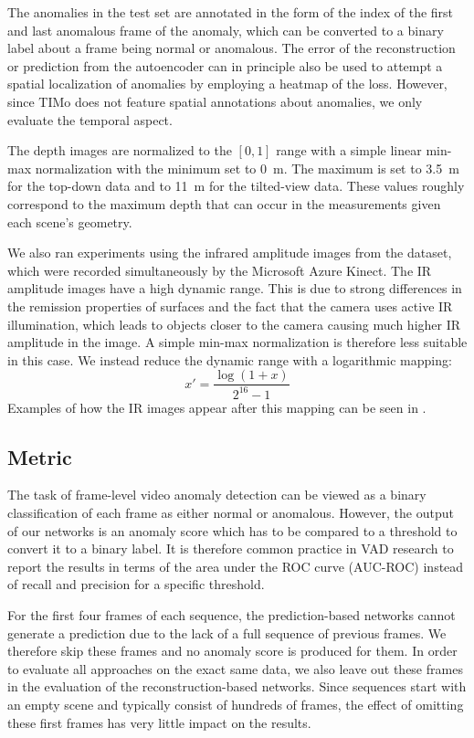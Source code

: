 \documentclass[10pt,twocolumn,letterpaper]{article}
\begin{document}
The anomalies in the test set are annotated in the form of the index of the first and last anomalous frame of the anomaly, which can be converted to a binary label about a frame being normal or anomalous. The error of the reconstruction or prediction from the autoencoder can in principle also be used to attempt a spatial localization of anomalies by employing a heatmap of the loss. However, since TIMo does not feature spatial annotations about anomalies, we only evaluate the temporal aspect.

The depth images are normalized to the $[0,1]$ range with a simple linear min-max normalization with the minimum set to \SI{0}{\meter}. The maximum is set to \SI{3.5}{\meter} for the top-down data and to \SI{11}{\meter} for the tilted-view data. These values roughly correspond to the maximum depth that can occur in the measurements given each scene's geometry.

We also ran experiments using the infrared amplitude images from the dataset, which were recorded simultaneously by the Microsoft Azure Kinect. The IR amplitude images have a high dynamic range. This is due to strong differences in the remission properties of surfaces and the fact that the camera uses active IR illumination, which leads to objects closer to the camera causing much higher IR amplitude in the image. A simple min-max normalization is therefore less suitable in this case. We instead reduce the dynamic range with a logarithmic mapping:
\begin{equation}
    x' = \frac{\log (1+x)}{2^{16} - 1}
\end{equation}
Examples of how the IR images appear after this mapping can be seen in .

\subsection{Metric}
The task of frame-level video anomaly detection can be viewed as a binary classification of each frame as either normal or anomalous. However, the output of our networks is an anomaly score which has to be compared to a threshold to convert it to a binary label. It is therefore common practice in VAD research to report the results in terms of the area under the ROC curve (AUC-ROC) instead of recall and precision for a specific threshold. 

For the first four frames of each sequence, the prediction-based networks cannot generate a prediction due to the lack of a full sequence of previous frames. We therefore skip these frames and no anomaly score is produced for them. In order to evaluate all approaches on the exact same data, we also leave out these frames in the evaluation of the reconstruction-based networks. Since sequences start with an empty scene and typically consist of hundreds of frames, the effect of omitting these first frames has very little impact on the results.
\end{document}
